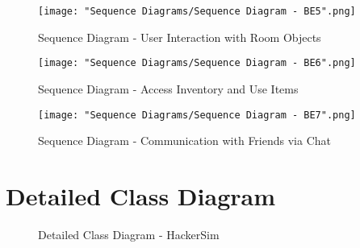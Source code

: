 \documentclass[]{article}
\begin{document}
\begin{figure}[H]
    \centering
    \texttt{[image: "Sequence Diagrams/Sequence Diagram - BE5".png]}
    \caption{Sequence Diagram - User Interaction with Room Objects}
\end{figure}

\begin{figure}[H]
    \centering
    \texttt{[image: "Sequence Diagrams/Sequence Diagram - BE6".png]}
    \caption{Sequence Diagram - Access Inventory and Use Items}
\end{figure}

\begin{figure}[H]
    \centering
    \texttt{[image: "Sequence Diagrams/Sequence Diagram - BE7".png]}
    \caption{Sequence Diagram - Communication with Friends via Chat}
\end{figure}

\section{Detailed Class Diagram}
\label{sec:detailed_class_diagram}
\begin{figure}[H]
    \centering
    \caption{Detailed Class Diagram - HackerSim}
\end{figure}

\newpage
\appendix
\end{document}
